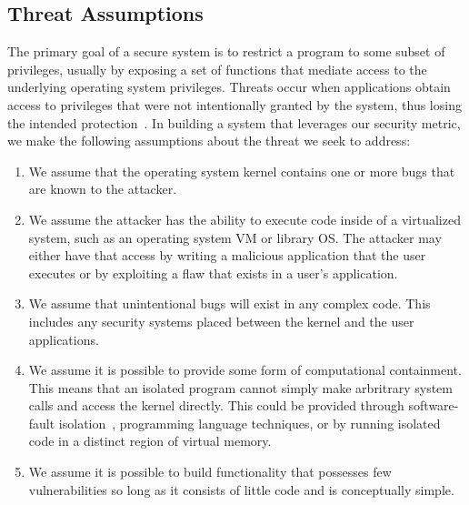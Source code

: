 
\subsection{Threat Assumptions}

The primary goal of a secure system is to restrict a program to some subset
of privileges, 
usually by exposing a set of functions that mediate access to the
underlying operating system privileges. 
Threats occur when applications obtain access to privileges that were not
intentionally granted by the system, 
thus losing the intended protection~\cite{Repy-10}. In building a system
that leverages our security metric, 
we make the following assumptions about the threat we seek to address:

\begin{enumerate}
\item We assume that the operating system kernel contains one or more bugs 
that are known to the attacker.

\item We assume the attacker has the ability to execute code inside
of a virtualized system, such as an operating system VM or library OS.
The attacker may either have that access by writing a malicious application
that the user executes or by exploiting a flaw that exists in a user's
application.


\item We assume that unintentional bugs will exist in any complex code.  This
includes any security systems placed between the kernel and the user
applications.

\item We assume it is possible to provide some form of computational 
containment.  This means that an isolated program cannot simply
make arbritrary system calls and access the kernel directly.  This could
be provided through software-fault isolation~\cite{SFI:93}, programming 
language techniques, or by running isolated code in a
distinct region of virtual memory.

\item We assume it is possible to build functionality that possesses few
vulnerabilities so long as it consists of little code and is conceptually 
simple.

\end{enumerate}

